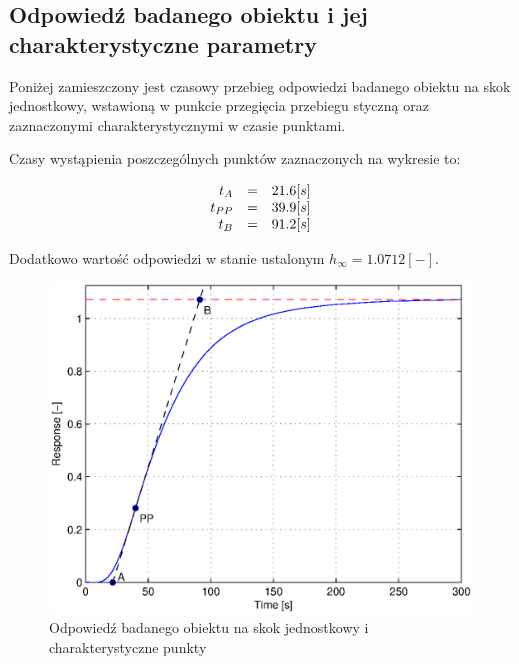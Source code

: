 \documentclass[12pt]{article}
\begin{document}
\newpage

\subsection{Odpowiedź badanego obiektu i jej charakterystyczne parametry}

Poniżej zamieszczony jest czasowy przebieg odpowiedzi badanego obiektu na skok
jednostkowy, wstawioną w punkcie przegięcia przebiegu styczną oraz zaznaczonymi
charakterystycznymi w czasie punktami.

Czasy wystąpienia poszczególnych punktów zaznaczonych na wykresie to:

\begin{equation} 
\begin{array}{r c l}
	t_A&=&21.6[s] \\
	t_{PP}&=&39.9[s] \\
	t_B&=&91.2[s]
\end{array}
\label{equ:params}
\end{equation}

Dodatkowo wartość odpowiedzi w stanie ustalonym $h_{\infty}=1.0712[-]$.

\begin{figure}[!htb]
	\begin{center}
		\includegraphics[width=13cm]{../res/img/resppom.eps}
	\end{center} 
	\caption{Odpowiedź badanego obiektu na skok jednostkowy i charakterystyczne
	punkty}
\end{figure}

\newpage
\end{document}
